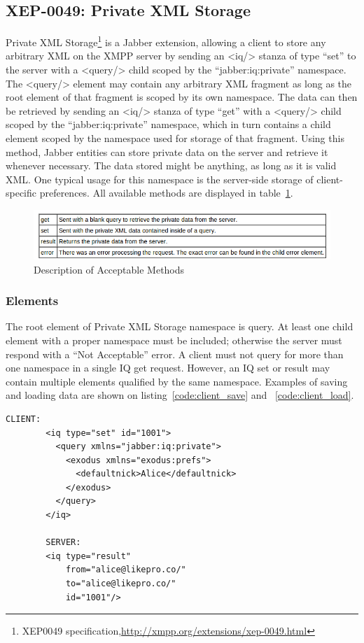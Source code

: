\subsection{XEP-0049: Private XML Storage}
	Private XML Storage\footnote{XEP0049 specification,\url{http://xmpp.org/extensions/xep-0049.html}} is a Jabber extension, allowing a client to store any arbitrary XML on the XMPP server by sending an <iq/> stanza of type ``set'' to the server with a <query/> child scoped by the ``jabber:iq:private'' namespace. The <query/> element may contain any arbitrary XML fragment as long as the root element of that fragment is scoped by its own namespace. The data can then be retrieved by sending an <iq/> stanza of type ``get'' with a <query/> child scoped by the ``jabber:iq:private'' namespace, which in turn contains a child element scoped by the namespace used for storage of that fragment. Using this method, Jabber entities can store private data on the server and retrieve it whenever necessary. The data stored might be anything, as long as it is valid XML. One typical usage for this namespace is the server-side storage of client-specific preferences. All available methods are displayed in table~\ref{img:xep49-methods}.
	
	\begin{figure}[!ht]
		\centering
		\includegraphics[scale=0.9]{images/xep0049Queries.png}   
		\caption[ Description of Acceptable Methods]{Description of Acceptable Methods}
		\label{img:xep49-methods}
		\end{figure}
	\subsubsection{Elements}
	The root element of Private XML Storage namespace is query. At least one child element with a proper namespace must be included; otherwise the server must respond with a ``Not Acceptable'' error. A client must not query for more than one namespace in a single IQ get request. However, an IQ set or result may contain multiple elements qualified by the same namespace. Examples of saving and loading data are shown on listing~\ref{code:client_save} and ~\ref{code:client_load}.

    \begin{lstlisting}[label=code:client_save,caption=Client Stores Private Data]
		CLIENT:
		<iq type="set" id="1001">
		  <query xmlns="jabber:iq:private">
		    <exodus xmlns="exodus:prefs">
		      <defaultnick>Alice</defaultnick>
		    </exodus>
		  </query>
		</iq>

		SERVER:
		<iq type="result"
		    from="alice@likepro.co/"
		    to="alice@likepro.co/"
		    id="1001"/>
    \end{lstlisting}

